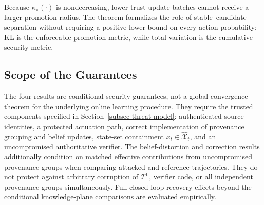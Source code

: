 Because $\kappa_\pi(\cdot)$ is nondecreasing, lower-trust update batches cannot receive a larger promotion radius. The theorem formalizes the role of stable--candidate separation without requiring a positive lower bound on every action probability; KL is the enforceable promotion metric, while total variation is the cumulative security metric.

\subsection{Scope of the Guarantees}
The four results are conditional security guarantees, not a global convergence theorem for the underlying online learning procedure. They require the trusted components specified in Section~\ref{subsec-threat-model}: authenticated source identities, a protected actuation path, correct implementation of provenance grouping and belief updates, state-set containment $x_t\in\widehat{\mathcal X}_t$, and an uncompromised authoritative verifier. The belief-distortion and correction results additionally condition on matched effective contributions from uncompromised provenance groups when comparing attacked and reference trajectories. They do not protect against arbitrary corruption of $\mathcal T^0$, verifier code, or all independent provenance groups simultaneously. Full closed-loop recovery effects beyond the conditional knowledge-plane comparisons are evaluated empirically.
